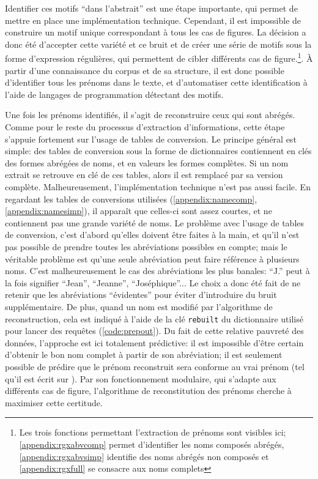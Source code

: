 Identifier ces motifs \enquote{dans l'abstrait} est une étape importante, qui permet de mettre en place une implémentation technique. Cependant, il est impossible de construire un motif unique correspondant à tous les cas de figures. La décision a donc été d'accepter cette variété et ce bruit et de créer une série de motifs sous la forme d'\glspl{expression régulière}, qui permettent de cibler différents cas de figure.\footnote{Les trois fonctions permettant l'extraction de prénoms sont visibles ici; \ref{appendix:rgxabvcomp} permet d'identifier les noms composés abrégés, \ref{appendix:rgxabvsimp} identifie des noms abrégés non composés et \ref{appendix:rgxfull} se consacre aux noms complets}. À partir d'une connaissance du corpus et de sa structure, il est donc possible d'identifier tous les prénoms dans le texte, et d'automatiser cette identification à l'aide de langages de programmation détectant des motifs.

Une fois les prénoms identifiés, il s'agit de reconstruire ceux qui sont abrégés. Comme pour le reste du processus d'extraction d'informations, cette étape s'appuie fortement sur l'usage de tables de conversion. Le principe général est simple: des tables de conversion sous la forme de \glspl{dictionnaire} contiennent en clés des formes abrégées de noms, et en valeurs les formes complètes. Si un nom extrait se retrouve en clé de ces tables, alors il est remplacé par sa version complète. Malheureusement, l'implémentation technique n'est pas aussi facile. En regardant les tables de conversions utilisées (\ref{appendix:namecomp}, \ref{appendix:namesimp}), il apparaît que celles-ci sont assez courtes, et ne contiennent pas une grande variété de noms. Le problème avec l'usage de tables de conversion, c'est d'abord qu'elles doivent être faites à la main, et qu'il n'est pas possible de prendre toutes les abréviations possibles en compte; mais le véritable problème est qu'une seule abréviation peut faire référence à plusieurs noms. C'est malheureusement le cas des abréviations les plus banales: \enquote{J.} peut à la fois signifier \enquote{Jean}, \enquote{Jeanne}, \enquote{Joséphique}...  Le choix a donc été fait de ne retenir que les abréviations \enquote{évidentes} pour éviter d'introduire du bruit supplémentaire. De plus, quand un nom est modifié par l'algorithme de reconstruction, cela est indiqué à l'aide de la clé \texttt{rebuilt} du dictionnaire utilisé pour lancer des requêtes (\ref{code:prepout}). Du fait de cette relative pauvreté des données, l'approche est ici totalement prédictive: il est impossible d'être certain d'obtenir le bon nom complet à partir de son abréviation; il est seulement possible de prédire que le prénom reconstruit sera conforme au vrai prénom (tel qu'il est écrit sur \wkd{}). Par son fonctionnement modulaire, qui s'adapte aux différents cas de figure, l'algorithme de reconstitution des prénoms cherche à maximiser cette certitude.

